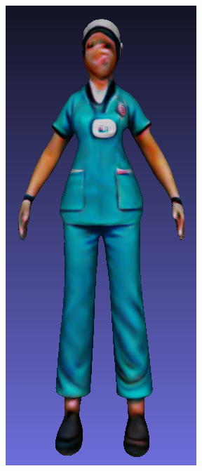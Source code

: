 \begin{figure}[H]
    \centering
    \small
    \begin{subfigure}[b]{0.13\textwidth}
        \centering
        \includegraphics[width=\textwidth]{etc/bias/bias_nurse_genie_1.png}

\end{subfigure}
\end{figure}
